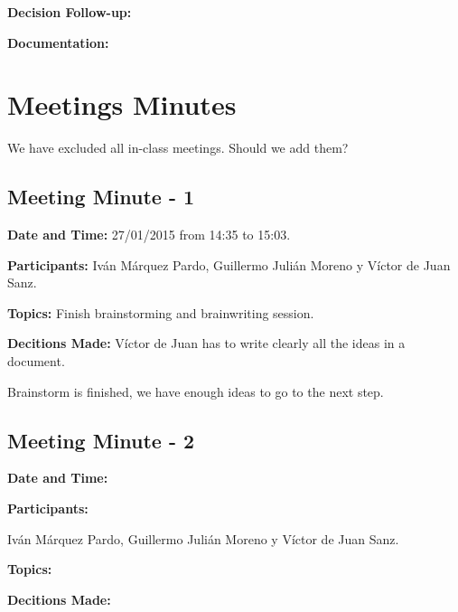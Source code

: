 \documentclass{sgnip}
\begin{document}
\textbf{Decision Follow-up: }


\textbf{Documentation: }


\section{Meetings Minutes}

We have excluded all in-class meetings. Should we add them?

\subsection{Meeting Minute - 1}


\textbf{Date and Time:} 27/01/2015 from 14:35 to 15:03.


\textbf{Participants: } Iván Márquez Pardo, Guillermo Julián Moreno y Víctor de Juan Sanz.


\textbf{Topics: }
Finish brainstorming and brainwriting session.


\textbf{Decitions Made: }
Víctor de Juan has to write clearly all the ideas in a document.

Brainstorm is finished, we have enough ideas to go to the next step.

\subsection{Meeting Minute - 2}


\textbf{Date and Time:} 


\textbf{Participants: }

Iván Márquez Pardo, Guillermo Julián Moreno y Víctor de Juan Sanz.


\textbf{Topics: }


\textbf{Decitions Made: }
\end{document}
